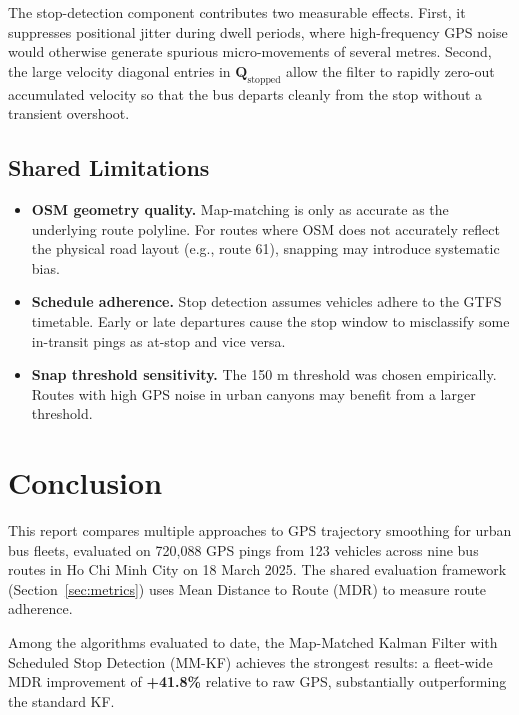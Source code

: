\documentclass[12pt, a4paper]{article}
\begin{document}
The stop-detection component contributes two measurable effects. First, it
suppresses positional jitter during dwell periods, where high-frequency GPS
noise would otherwise generate spurious micro-movements of several metres.
Second, the large velocity diagonal entries in $\mathbf{Q}_{\text{stopped}}$
allow the filter to rapidly zero-out accumulated velocity so that the bus
departs cleanly from the stop without a transient overshoot.

\subsection{Shared Limitations}

\begin{itemize}
    \item \textbf{OSM geometry quality.} Map-matching is only as accurate as
          the underlying route polyline. For routes where OSM does not
          accurately reflect the physical road layout (e.g., route 61), snapping
          may introduce systematic bias.

    \item \textbf{Schedule adherence.} Stop detection assumes vehicles adhere
          to the GTFS timetable. Early or late departures cause the stop window
          to misclassify some in-transit pings as at-stop and vice versa.

    \item \textbf{Snap threshold sensitivity.} The 150 m threshold was chosen
          empirically. Routes with high GPS noise in urban canyons may benefit
          from a larger threshold.
\end{itemize}

\section{Conclusion}

This report compares multiple approaches to GPS trajectory smoothing for urban
bus fleets, evaluated on 720,088 GPS pings from 123 vehicles across nine bus
routes in Ho Chi Minh City on 18 March 2025. The shared evaluation framework
(Section~\ref{sec:metrics}) uses Mean Distance to Route (MDR) to measure
route adherence.

Among the algorithms evaluated to date, the Map-Matched Kalman Filter with
Scheduled Stop Detection (MM-KF) achieves the strongest results: a fleet-wide
MDR improvement of \textbf{+41.8\%} relative to raw GPS, substantially
outperforming the standard KF.
\end{document}
